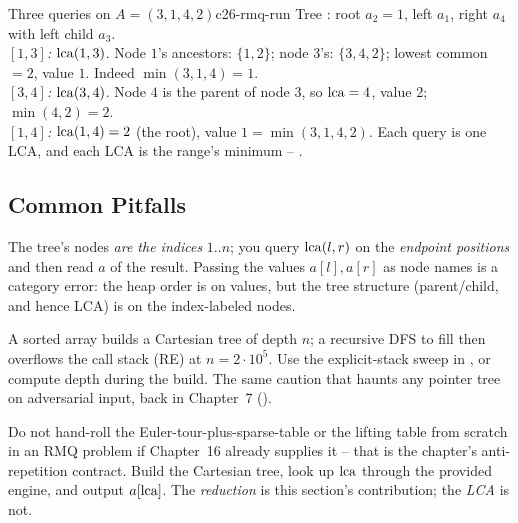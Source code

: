\begin{example}{Three queries on $A=(3,1,4,2)$}{c26-rmq-run}
Tree : root $a_2{=}1$, left $a_1$, right $a_4$ with left child $a_3$.\\
\emph{$[1,3]$:} $\operatorname{lca}(1,3)$. Node $1$'s ancestors: $\{1,2\}$; node $3$'s: $\{3,4,2\}$; lowest common $=2$,
value $1$. Indeed $\min(3,1,4)=1$.\\
\emph{$[3,4]$:} $\operatorname{lca}(3,4)$. Node $4$ is the parent of node $3$, so $\operatorname{lca}=4$, value $2$;
$\min(4,2)=2$.\\
\emph{$[1,4]$:} $\operatorname{lca}(1,4)=2$ (the root), value $1=\min(3,1,4,2)$. Each query is one LCA, and each LCA is
the range's minimum -- . \checkmark
\end{example}

\subsection{Common Pitfalls}\label{sec:c26-rmq-pitfalls}

\begin{warningbox}
The tree's nodes \emph{are the indices} $1..n$; you query $\operatorname{lca}(l,r)$ on the \emph{endpoint positions}
and then read $a$ of the result. Passing the values $a[l],a[r]$ as node names is a category error: the
heap order is on values, but the tree structure (parent/child, and hence LCA) is on the index-labeled
nodes.
\end{warningbox}

\begin{warningbox}
A sorted array builds a Cartesian tree of depth $n$; a recursive DFS to fill  then overflows
the call stack (RE) at $n=2\cdot10^5$. Use the explicit-stack sweep in , or compute
depth during the build. The same caution that haunts any pointer tree on adversarial input, back in
Chapter~7 ().
\end{warningbox}

\begin{warningbox}
Do not hand-roll the Euler-tour-plus-sparse-table or the lifting table from scratch in an RMQ problem if
Chapter~16 already supplies it -- that is the chapter's anti-repetition contract. Build the Cartesian
tree, look up $\operatorname{lca}$ through the provided engine, and output $a[\operatorname{lca}]$. The \emph{reduction} is this
section's contribution; the \emph{LCA} is not.
\end{warningbox}


